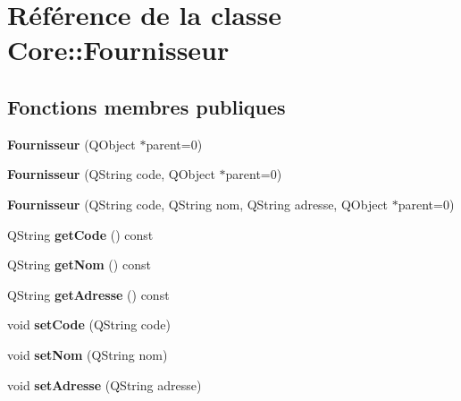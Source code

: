 \hypertarget{class_core_1_1_fournisseur}{
\section{Référence de la classe Core::Fournisseur}
\label{dd/d46/class_core_1_1_fournisseur}
}
\subsection*{Fonctions membres publiques}
\begin{DoxyCompactItemize}
\item 
\hypertarget{class_core_1_1_fournisseur_a92a66f86c739e9d99e706f37e20c9e23}{
{\bfseries Fournisseur} (QObject $\ast$parent=0)}
\label{dd/d46/class_core_1_1_fournisseur_a92a66f86c739e9d99e706f37e20c9e23}

\item 
\hypertarget{class_core_1_1_fournisseur_aa1769c68daafe9ca019e7f44b58733ab}{
{\bfseries Fournisseur} (QString code, QObject $\ast$parent=0)}
\label{dd/d46/class_core_1_1_fournisseur_aa1769c68daafe9ca019e7f44b58733ab}

\item 
\hypertarget{class_core_1_1_fournisseur_a589b320b955a1d579289feb1a86b1b1a}{
{\bfseries Fournisseur} (QString code, QString nom, QString adresse, QObject $\ast$parent=0)}
\label{dd/d46/class_core_1_1_fournisseur_a589b320b955a1d579289feb1a86b1b1a}

\item 
\hypertarget{class_core_1_1_fournisseur_a2057eff46212798f46a77f796843a85b}{
QString {\bfseries getCode} () const }
\label{dd/d46/class_core_1_1_fournisseur_a2057eff46212798f46a77f796843a85b}

\item 
\hypertarget{class_core_1_1_fournisseur_a1992269f4001ee5334da232cd38b0b4f}{
QString {\bfseries getNom} () const }
\label{dd/d46/class_core_1_1_fournisseur_a1992269f4001ee5334da232cd38b0b4f}

\item 
\hypertarget{class_core_1_1_fournisseur_a72dad10866538b2d8b85a89cfd913120}{
QString {\bfseries getAdresse} () const }
\label{dd/d46/class_core_1_1_fournisseur_a72dad10866538b2d8b85a89cfd913120}

\item 
\hypertarget{class_core_1_1_fournisseur_adf1f53ad62c589fd3d899b80df8f4aba}{
void {\bfseries setCode} (QString code)}
\label{dd/d46/class_core_1_1_fournisseur_adf1f53ad62c589fd3d899b80df8f4aba}

\item 
\hypertarget{class_core_1_1_fournisseur_a28c8cef8779014374039af0995a12153}{
void {\bfseries setNom} (QString nom)}
\label{dd/d46/class_core_1_1_fournisseur_a28c8cef8779014374039af0995a12153}

\item 
\hypertarget{class_core_1_1_fournisseur_a9749cce0ebc40fd3a3791490cea9bb9c}{
void {\bfseries setAdresse} (QString adresse)}
\label{dd/d46/class_core_1_1_fournisseur_a9749cce0ebc40fd3a3791490cea9bb9c}

\end{DoxyCompactItemize}
